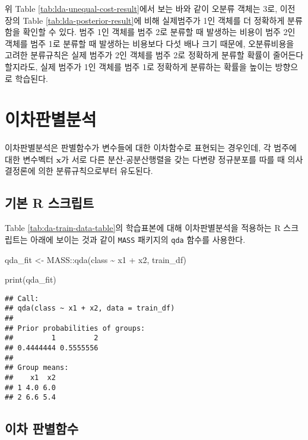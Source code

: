 \documentclass[
]{book}
\newenvironment{Shaded}{\begin{snugshade}}{\end{snugshade}}
\newcommand{\FunctionTok}[1]{\textcolor[rgb]{0.00,0.00,0.00}{#1}}
\newcommand{\NormalTok}[1]{#1}
\newcommand{\OtherTok}[1]{\textcolor[rgb]{0.56,0.35,0.01}{#1}}
\newcommand{\SpecialCharTok}[1]{\textcolor[rgb]{0.00,0.00,0.00}{#1}}
\begin{document}
위 Table \ref{tab:lda-unequal-cost-result}에서 보는 바와 같이 오분류 객체는 3로, 이전 장의 Table \ref{tab:lda-posterior-result}에 비해 실제범주가 1인 객체를 더 정확하게 분류함을 확인할 수 있다. 범주 1인 객체를 범주 2로 분류할 때 발생하는 비용이 범주 2인 객체를 범주 1로 분류할 때 발생하는 비용보다 다섯 배나 크기 때문에, 오분류비용을 고려한 분류규칙은 실제 범주가 2인 객체를 범주 2로 정확하게 분류할 확률이 줄어든다 할지라도, 실제 범주가 1인 객체를 범주 1로 정확하게 분류하는 확률을 높이는 방향으로 학습된다.

\hypertarget{qda}{%
\section{이차판별분석}\label{qda}}

이차판별분석은 판별함수가 변수들에 대한 이차함수로 표현되는 경우인데, 각 범주에 대한 변수벡터 \(\mathbf{x}\)가 서로 다른 분산-공분산행렬을 갖는 다변량 정규분포를 따를 때 의사결정론에 의한 분류규칙으로부터 유도된다.

\hypertarget{qda-basic-script}{%
\subsection{기본 R 스크립트}\label{qda-basic-script}}

Table \ref{tab:da-train-data-table}의 학습표본에 대해 이차판별분석을 적용하는 R 스크립트는 아래에 보이는 것과 같이 \texttt{MASS} 패키지의 \texttt{qda} 함수를 사용한다.

\begin{Shaded}
\begin{Highlighting}[]
\NormalTok{qda\_fit }\OtherTok{\textless{}{-}}\NormalTok{ MASS}\SpecialCharTok{::}\FunctionTok{qda}\NormalTok{(class }\SpecialCharTok{\textasciitilde{}}\NormalTok{ x1 }\SpecialCharTok{+}\NormalTok{ x2, train\_df)}

\FunctionTok{print}\NormalTok{(qda\_fit)}
\end{Highlighting}
\end{Shaded}

\begin{verbatim}
## Call:
## qda(class ~ x1 + x2, data = train_df)
## 
## Prior probabilities of groups:
##         1         2 
## 0.4444444 0.5555556 
## 
## Group means:
##    x1  x2
## 1 4.0 6.0
## 2 6.6 5.4
\end{verbatim}

\hypertarget{qda-function}{%
\subsection{이차 판별함수}\label{qda-function}}
\end{document}
